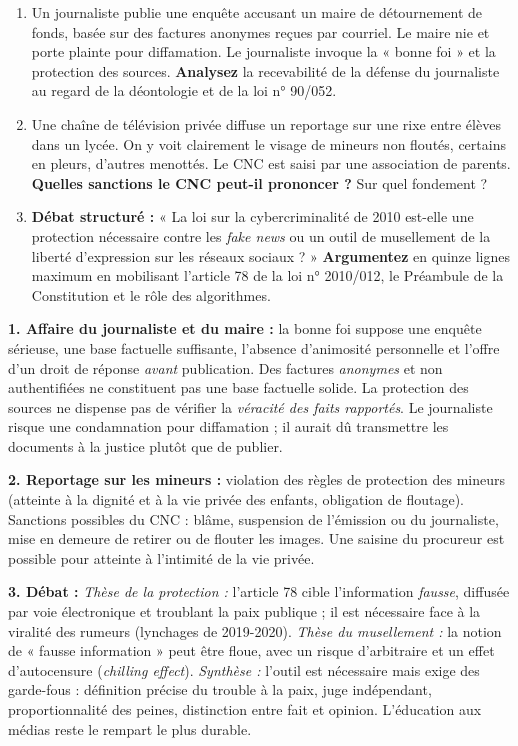 \documentclass[11pt]{article}
\begin{document}
\begin{exercice}
\begin{enumerate}
    \item Un journaliste publie une enquête accusant un maire de détournement de fonds, basée sur des factures anonymes reçues par courriel. Le maire nie et porte plainte pour diffamation. Le journaliste invoque la « bonne foi » et la protection des sources. \textbf{Analysez} la recevabilité de la défense du journaliste au regard de la déontologie et de la loi n° 90/052.
    \item Une chaîne de télévision privée diffuse un reportage sur une rixe entre élèves dans un lycée. On y voit clairement le visage de mineurs non floutés, certains en pleurs, d'autres menottés. Le CNC est saisi par une association de parents. \textbf{Quelles sanctions le CNC peut-il prononcer ?} Sur quel fondement ?
    \item \textbf{Débat structuré :} « La loi sur la cybercriminalité de 2010 est-elle une protection nécessaire contre les \emph{fake news} ou un outil de musellement de la liberté d'expression sur les réseaux sociaux ? » \textbf{Argumentez} en quinze lignes maximum en mobilisant l'article 78 de la loi n° 2010/012, le Préambule de la Constitution et le rôle des algorithmes.
\end{enumerate}
\end{exercice}

\begin{corrige}
\textbf{1. Affaire du journaliste et du maire :} la bonne foi suppose une enquête sérieuse, une base factuelle suffisante, l'absence d'animosité personnelle et l'offre d'un droit de réponse \emph{avant} publication. Des factures \emph{anonymes} et non authentifiées ne constituent pas une base factuelle solide. La protection des sources ne dispense pas de vérifier la \emph{véracité des faits rapportés}. Le journaliste risque une condamnation pour diffamation ; il aurait dû transmettre les documents à la justice plutôt que de publier.

\textbf{2. Reportage sur les mineurs :} violation des règles de protection des mineurs (atteinte à la dignité et à la vie privée des enfants, obligation de floutage). Sanctions possibles du CNC : blâme, suspension de l'émission ou du journaliste, mise en demeure de retirer ou de flouter les images. Une saisine du procureur est possible pour atteinte à l'intimité de la vie privée.

\textbf{3. Débat :} \emph{Thèse de la protection :} l'article 78 cible l'information \emph{fausse}, diffusée par voie électronique et troublant la paix publique ; il est nécessaire face à la viralité des rumeurs (lynchages de 2019-2020). \emph{Thèse du musellement :} la notion de « fausse information » peut être floue, avec un risque d'arbitraire et un effet d'autocensure (\emph{chilling effect}). \emph{Synthèse :} l'outil est nécessaire mais exige des garde-fous : définition précise du trouble à la paix, juge indépendant, proportionnalité des peines, distinction entre fait et opinion. L'éducation aux médias reste le rempart le plus durable.
\end{corrige}
\end{document}
